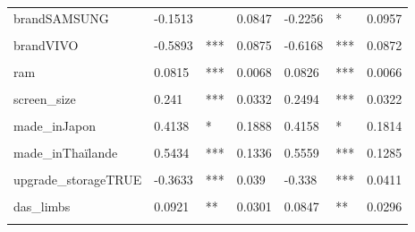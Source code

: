 \documentclass[
  12pt,
]{report}
\begin{document}
\begin{table}[!h]
\begin{tabular}[t]{lllllll}
brandSAMSUNG & -0.1513 &  & 0.0847 & -0.2256 & * & 0.0957\\
\cellcolor{gray!6}{brandSONY} & \cellcolor{gray!6}{-0.356} & \cellcolor{gray!6}{**} & \cellcolor{gray!6}{0.1154} & \cellcolor{gray!6}{-0.3962} & \cellcolor{gray!6}{***} & \cellcolor{gray!6}{0.1146}\\
brandVIVO & -0.5893 & *** & 0.0875 & -0.6168 & *** & 0.0872\\
\cellcolor{gray!6}{brandXIAOMI} & \cellcolor{gray!6}{-0.7591} & \cellcolor{gray!6}{***} & \cellcolor{gray!6}{0.0561} & \cellcolor{gray!6}{-0.7829} & \cellcolor{gray!6}{***} & \cellcolor{gray!6}{0.0578}\\
\addlinespace
ram & 0.0815 & *** & 0.0068 & 0.0826 & *** & 0.0066\\
\cellcolor{gray!6}{inductionTRUE} & \cellcolor{gray!6}{0.2724} & \cellcolor{gray!6}{***} & \cellcolor{gray!6}{0.0365} & \cellcolor{gray!6}{0.2857} & \cellcolor{gray!6}{***} & \cellcolor{gray!6}{0.0375}\\
screen\_size & 0.241 & *** & 0.0332 & 0.2494 & *** & 0.0322\\
\cellcolor{gray!6}{made\_inInde} & \cellcolor{gray!6}{-0.2249} & \cellcolor{gray!6}{} & \cellcolor{gray!6}{0.2332} & \cellcolor{gray!6}{-0.151} & \cellcolor{gray!6}{} & \cellcolor{gray!6}{0.2258}\\
made\_inJapon & 0.4138 & * & 0.1888 & 0.4158 & * & 0.1814\\
\addlinespace
\cellcolor{gray!6}{made\_inTaïwan} & \cellcolor{gray!6}{0.4755} & \cellcolor{gray!6}{*} & \cellcolor{gray!6}{0.2336} & \cellcolor{gray!6}{0.5101} & \cellcolor{gray!6}{*} & \cellcolor{gray!6}{0.2233}\\
made\_inThaïlande & 0.5434 & *** & 0.1336 & 0.5559 & *** & 0.1285\\
\cellcolor{gray!6}{made\_inViêt Nam} & \cellcolor{gray!6}{-0.1489} & \cellcolor{gray!6}{**} & \cellcolor{gray!6}{0.0531} & \cellcolor{gray!6}{-0.1071} & \cellcolor{gray!6}{} & \cellcolor{gray!6}{0.0576}\\
upgrade\_storageTRUE & -0.3633 & *** & 0.039 & -0.338 & *** & 0.0411\\
\cellcolor{gray!6}{das\_head} & \cellcolor{gray!6}{-0.209} & \cellcolor{gray!6}{***} & \cellcolor{gray!6}{0.0612} & \cellcolor{gray!6}{-0.2046} & \cellcolor{gray!6}{***} & \cellcolor{gray!6}{0.0587}\\
\addlinespace
das\_limbs & 0.0921 & ** & 0.0301 & 0.0847 & ** & 0.0296\\
\cellcolor{gray!6}{das\_chest} & \cellcolor{gray!6}{-0.2993} & \cellcolor{gray!6}{**} & \cellcolor{gray!6}{0.0945} & \cellcolor{gray!6}{-0.1595} & \cellcolor{gray!6}{**} & \cellcolor{gray!6}{0.057}\\

\end{tabular}
\end{table}
\end{document}
